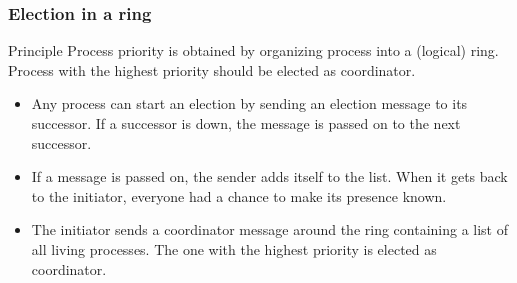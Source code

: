 \begin{frame}
    \frametitle{Election in a ring}
    \begin{block}{Principle}
        Process priority is obtained by organizing process into a (logical) ring. Process with the highest priority should be elected as coordinator.
    \end{block}

    \begin{itemize}
        \item Any process can start an election by sending an election message to its successor. If a successor is down, the message is passed on to the next successor.
        \item If a message is passed on, the sender adds itself to the list. When it gets back to the initiator, everyone had a chance to make its presence known.
        \item The initiator sends a coordinator message around the ring containing a list of all living processes. The one with the highest priority is elected as coordinator.
    \end{itemize}
\end{frame}

